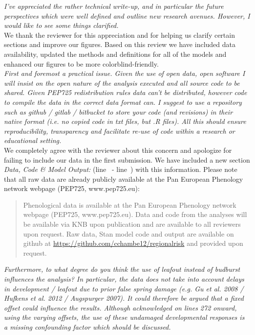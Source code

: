 \documentclass[11pt,a4paper]{article}\usepackage[]{graphicx}\usepackage[]{color}
\newcommand{\lr}[1]{line~\lineref{#1}}
\begin{document}
\textit{I've appreciated the rather technical write-up, and in particular the future perspectives which were well defined and outline new research avenues. However, I would like to see some things clarified.} \\

We thank the reviewer for this appreciation and for helping us clarify certain sections and improve our figures. Based on this review we have included data availability, updated the methods and definitions for all of the models and enhanced our figures to be more colorblind-friendly.  \\

\textit{First and foremost a practical issue. Given the use of open data, open software I will insist on the open nature of the analysis executed and all source code to be shared. Given PEP725 redistribution rules data can't be distributed, however code to compile the data in the correct data format can. I suggest to use a repository such as github / gitlab / bitbucket to store your code (and revisions) in their native format (i.e. no copied code in txt files, but .R files). All this should ensure reproducibility, transparency and facilitate re-use of code within a research or educational setting.} \\

We completely agree with the reviewer about this concern and apologize for failing to include our data in the first submission. We have included a new section \textit{Data, Code \& Model Output:} (\lr{R2data} - \lr{R2dataend}) with this information. Please note that all raw data are already publicly available at the Pan European Phenology network webpage (PEP725, www.pep725.eu): \\

\begin{quotation}
\noindent  Phenological data is available at the Pan European Phenology network webpage (PEP725, www.pep725.eu). Data and code from the analyses will be available via KNB upon publication and are available to all reviewers upon request. Raw data, {Stan} model code and output are available on github at \url{https://github.com/cchambe12/regionalrisk} and provided upon request.
\end{quotation}

\textit{Furthermore, to what degree do you think the use of leafout instead of budburst influences the analysis? In particular, the data does not take into account delays in development / leafout due to prior false spring damage (e.g. Gu et al. 2008 / Hufkens et al. 2012 / Augspurger 2007). It could therefore be argued that a fixed offset could influence the results. Although acknowledged on lines 272 onward, using the varying offsets, the use of these undamaged developmental responses is a missing confounding factor which should be discussed.} \\
\end{document}
